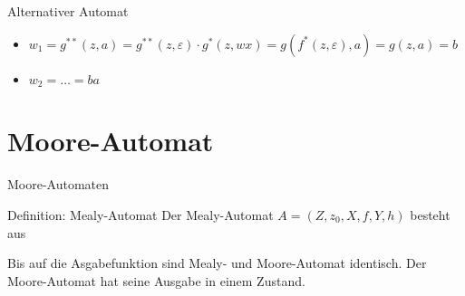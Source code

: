 \begin{frame}{Alternativer Automat}
    \begin{figure}
    \centering
    \end{figure}
    \begin{itemize}
        \item $w_1 = g^{**}\left( z, a \right) = g^{**}\left( z, \varepsilon \right)\cdot g^*\left( z, wx \right) = g\left( f^*\left( z, \varepsilon \right), a \right) = g\left( z, a \right) = b$
        \item $w_2 = \dots = ba$
    \end{itemize}
\end{frame}

\section{Moore-Automat}
\begin{frame}{Moore-Automaten}
    \begin{block}{Definition: Mealy-Automat}
        Der Mealy-Automat $A = \left( Z, z_0, X, f, Y, h \right)$ besteht aus
        \pause
    \end{block}
    Bis auf die Asgabefunktion sind Mealy- und Moore-Automat identisch. Der Moore-Automat hat seine Ausgabe in einem Zustand.
\end{frame}

